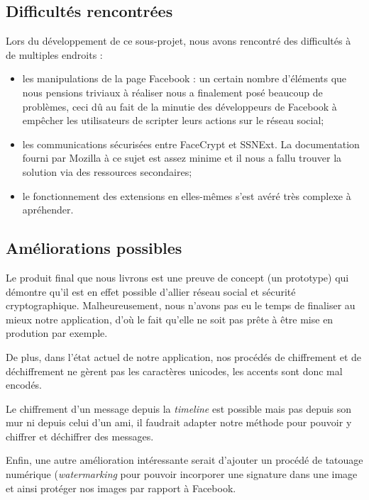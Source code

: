 \documentclass[a4paper,11pt,french]{article}
\begin{document}
\subsection{Difficultés rencontrées}
Lors du développement de ce sous-projet, nous avons rencontré des difficultés
à de multiples endroits :
\begin{itemize}
    \item les manipulations de la page Facebook : un certain nombre d'éléments 
    que nous pensions triviaux à réaliser nous a finalement posé beaucoup de 
    problèmes, ceci dû au fait de la minutie des développeurs de Facebook à
    empêcher les utilisateurs de \og{}scripter \fg{} leurs actions sur le réseau
    social;
    \item les communications sécurisées entre FaceCrypt et SSNExt. La documentation
	fourni par Mozilla à ce sujet est assez minime et il nous a fallu trouver 
	la solution via des ressources secondaires;
    \item le fonctionnement des extensions en elles-mêmes s'est avéré très
    complexe à apréhender.
\end{itemize}

\subsection{Améliorations possibles}
Le produit final que nous livrons est une preuve de concept (un prototype)
qui démontre qu'il est en effet possible d'allier réseau social et 
sécurité cryptographique. Malheureusement, nous n'avons pas eu le temps de 
finaliser au mieux notre application, d'où le fait qu'elle ne soit pas 
prête à être \og mise en prodution \fg{} par exemple. 

De plus, dans l'état actuel de notre application, nos procédés de 
chiffrement et de déchiffrement ne gèrent pas les caractères unicodes, 
les accents sont donc mal encodés.

Le chiffrement d'un message depuis la \emph{timeline} est possible mais
pas depuis son mur ni depuis celui d'un ami, il faudrait adapter notre 
méthode pour pouvoir y chiffrer et déchiffrer des messages.

Enfin, une autre amélioration intéressante serait d'ajouter un procédé
de tatouage numérique (\emph{watermarking} pour pouvoir incorporer une 
signature dans une image et ainsi protéger nos images par rapport à 
Facebook.

\clearpage

\appendix
\end{document}

